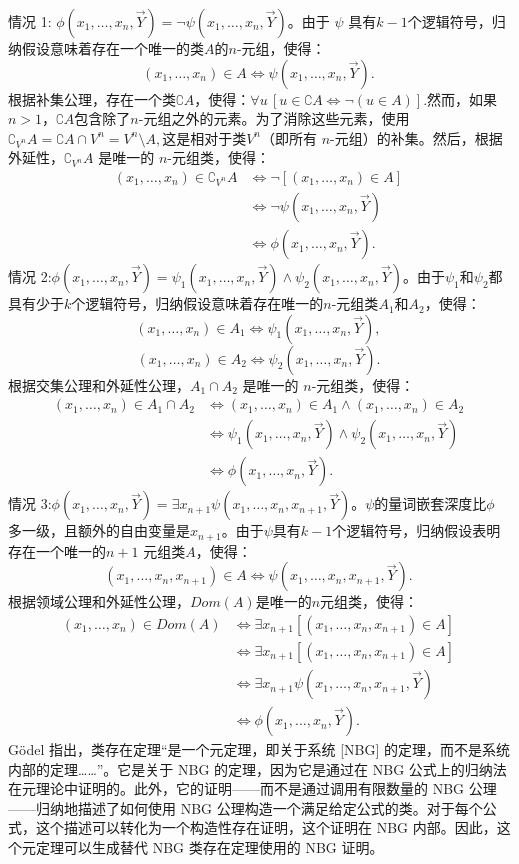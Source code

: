 情况 1:
\(\phi(x_1, \dots, x_n, \vec{Y}) = \neg \psi(x_1, \dots, x_n,\vec{Y})\)。由于 \(\psi\) 具有\(k - 1\)个逻辑符号，归纳假设意味着存在一个唯一的类\(A\)的\(n\)-元组，使得：
\[
(x_1, \dots, x_n) \in A \iff \psi(x_1, \dots, x_n, \vec{Y}).~
\]
根据补集公理，存在一个类\(\complement A\)，使得：\(\forall u \, [u \in \complement A\iff \neg(u \in A)]\).然而，如果\(n > 1\)，\(\complement A\)包含除了\(n\)-元组之外的元素。为了消除这些元素，使用\(\complement_{V^n} A = \complement A \cap V^n = V^n \setminus A,
\)这是相对于类\(V^n\)（即所有 \(n\)-元组）的补集。然后，根据外延性，\(\complement_{V^n} A\) 是唯一的 \(n\)-元组类，使得：
\[
\begin{aligned}
(x_1, \dots, x_n) \in \complement_{V^n} A &\iff \neg [(x_1, \dots, x_n) \in A]\\
&\iff \neg \psi(x_1, \dots, x_n, \vec{Y})\\
&\iff \phi(x_1, \dots, x_n, \vec{Y}).
\end{aligned}~
\]
情况 2:\(\phi(x_1, \dots, x_n, \vec{Y}) = \psi_1(x_1, \dots, x_n, \vec{Y}) \land \psi_2(x_1, \dots, x_n, \vec{Y})\)。由于\(\psi_1\)和\(\psi_2\)都具有少于\(k\)个逻辑符号，归纳假设意味着存在唯一的\(n\)-元组类\(A_1\)和\(A_2\)，使得：
\[
(x_1, \dots, x_n) \in A_1 \iff \psi_1(x_1, \dots, x_n, \vec{Y}),~
\]
\[
(x_1, \dots, x_n) \in A_2 \iff \psi_2(x_1, \dots, x_n,\vec{Y}).~
\]
根据交集公理和外延性公理，\(A_1 \cap A_2\) 是唯一的 \(n\)-元组类，使得：
\[
\begin{aligned}
(x_1, \dots, x_n) \in A_1 \cap A_2 &\iff (x_1, \dots, x_n) \in A_1 \land (x_1, \dots, x_n) \in A_2\\
&\iff \psi_1(x_1, \dots, x_n, \vec{Y}) \land \psi_2(x_1, \dots, x_n, \vec{Y})\\
&\iff \phi(x_1, \dots, x_n, \vec{Y}).
\end{aligned}~
\]
情况 3:\(\phi(x_1, \dots, x_n, \vec{Y}) = \exists x_{n+1} \psi(x_1, \dots, x_n, x_{n+1}, \vec{Y})\)。\(\psi\)的量词嵌套深度比\(\phi\) 多一级，且额外的自由变量是\(x_{n+1}\)。由于\(\psi\)具有\(k-1\)个逻辑符号，归纳假设表明存在一个唯一的\(n+1\) 元组类\(A\)，使得：
\[
(x_1, \dots, x_n, x_{n+1}) \in A \iff \psi(x_1, \dots, x_n, x_{n+1},\vec{Y}).~
\]
根据领域公理和外延性公理，\(Dom(A)\)是唯一的\(n\)元组类，使得：
\[
\begin{aligned}
(x_1, \dots, x_n) \in Dom(A) &\iff \exists x_{n+1} [(x_1, \dots, x_n, x_{n+1}) \in A]\\
&\iff \exists x_{n+1} [(x_1, \dots, x_n, x_{n+1}) \in A]\\
&\iff \exists x_{n+1} \psi(x_1, \dots, x_n, x_{n+1}, \vec{Y})\\
&\iff \phi(x_1, \dots, x_n, \vec{Y}).
\end{aligned}~
\]
Gödel 指出，类存在定理“是一个元定理，即关于系统 [NBG] 的定理，而不是系统内部的定理……”。它是关于 NBG 的定理，因为它是通过在 NBG 公式上的归纳法在元理论中证明的。此外，它的证明——而不是通过调用有限数量的 NBG 公理——归纳地描述了如何使用 NBG 公理构造一个满足给定公式的类。对于每个公式，这个描述可以转化为一个构造性存在证明，这个证明在 NBG 内部。因此，这个元定理可以生成替代 NBG 类存在定理使用的 NBG 证明。